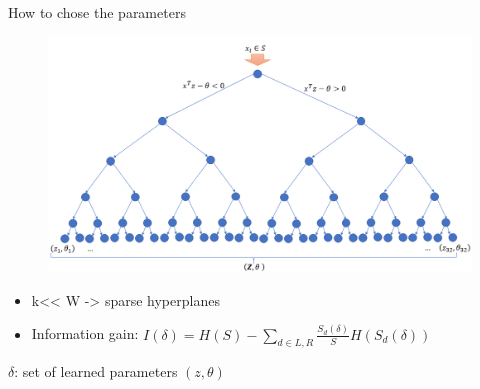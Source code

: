 \begin {frame}{How to chose the parameters}
\begin {figure}
\includegraphics[scale=0.35]{pictures/tree}
\end {figure}

\begin{itemize}
\item k<< W -> sparse hyperplanes
\item Information gain: $I(\delta) = H(S) -\sum_{d\in L,R} \frac{S_{d}(\delta)}{S} H(S_{d}(\delta))$
\end{itemize}
$\delta$: set of learned parameters $(z,\theta)$
\end{frame}
